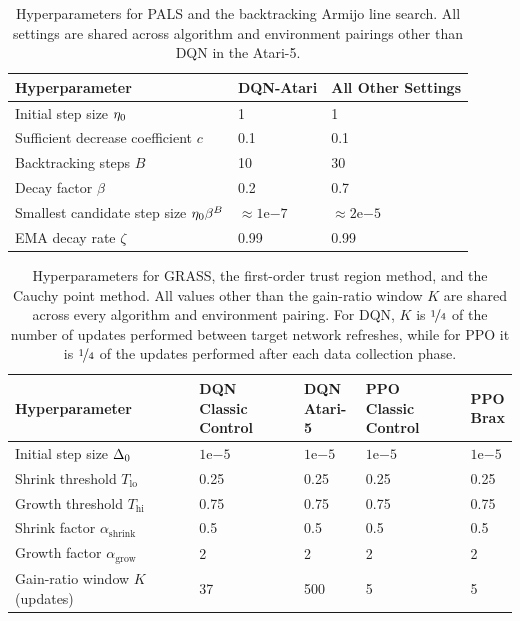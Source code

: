 \begin{table}[htbp]
\centering
\small
\setlength{\tabcolsep}{6pt}
\renewcommand{\arraystretch}{1.2}
\begin{tabular}{@{}l l l@{}}
\toprule
Hyperparameter & DQN-Atari & All Other Settings \\
\midrule
Initial step size $\eta_0$ & 1 & 1 \\
Sufficient decrease coefficient $c$ & 0.1 & 0.1 \\
Backtracking steps $B$ & 10 & 30 \\
Decay factor $\beta$ & 0.2 & 0.7 \\
Smallest candidate step size $\eta_0 \beta^B$ & $\approx 1\mathrm{e}{-7}$ & $\approx 2\mathrm{e}{-5}$ \\
EMA decay rate $\zeta$ & 0.99 & 0.99 \\
\bottomrule
\end{tabular}
\caption[Line search hyperparameters.]{Hyperparameters for PALS and the backtracking Armijo line search. All settings are shared across algorithm and environment pairings other than DQN in the Atari-5.}
\label{tab:ls_hypers}
\end{table}

\begin{table}[htbp]
\centering
\small
\setlength{\tabcolsep}{6pt}
\renewcommand{\arraystretch}{1.2}
\begin{tabular}{@{}l l l l l@{}}
\toprule
Hyperparameter & \makecell[l]{DQN \\ Classic Control} & \makecell[l]{DQN \\ Atari-5} & \makecell[l]{PPO \\ Classic Control} & \makecell[l]{PPO \\ Brax} \\
\midrule
Initial step size $\Delta_0$ & $1\mathrm{e}{-5}$ & $1\mathrm{e}{-5}$ & $1\mathrm{e}{-5}$ & $1\mathrm{e}{-5}$ \\
Shrink threshold $T_{\text{lo}}$ & 0.25 & 0.25 & 0.25 & 0.25 \\
Growth threshold $T_{\text{hi}}$ & 0.75 & 0.75 & 0.75 & 0.75 \\
Shrink factor $\alpha_{\text{shrink}}$ & 0.5 & 0.5 & 0.5 & 0.5 \\
Growth factor $\alpha_{\text{grow}}$ & 2 & 2 & 2 & 2 \\
Gain-ratio window $K$ (updates) & 37 & 500 & 5 & 5 \\
\bottomrule
\end{tabular}
\caption[Trust region hyperparameters.]{Hyperparameters for GRASS, the first-order trust region method, and the Cauchy point method. All values other than the gain-ratio window $K$ are shared across every algorithm and environment pairing. For DQN, $K$ is $\nicefrac{1}{4}$ of the number of updates performed between target network refreshes, while for PPO it is $\nicefrac{1}{4}$ of the updates performed after each data collection phase.}
\label{tab:tr_hypers}
\end{table}

